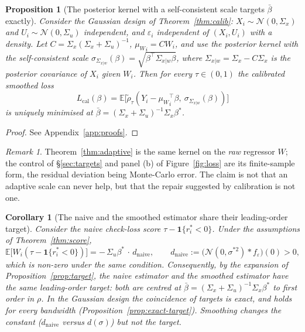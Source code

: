 \documentclass[12pt,a4paper]{article}
\newtheorem{proposition}[theorem]{Proposition}
\newtheorem{corollary}[theorem]{Corollary}
\theoremstyle{definition}
\theoremstyle{remark}
\newtheorem{remark}[theorem]{Remark}
\newcommand{\E}{\mathbb{E}}
\newcommand{\cN}{\mathcal{N}}
\newcommand{\ind}[1]{\mathbf{1}\{#1\}}
\newcommand{\rht}{\tilde{\rho}_\tau}
\newcommand{\betas}{\beta^*}
\newcommand{\bbar}{\bar{\beta}}
\newcommand{\muv}{\mu_W}
\newcommand{\Sxw}{\Sigma_{x|w}}
\newcommand{\Ccal}{C}
\begin{document}
\begin{proposition}[The posterior kernel with a self-consistent scale targets $\bbar$
exactly]
\label{prop:posterior-adaptive}
Consider the Gaussian design of Theorem~\ref{thm:calib}: $X_i\sim\cN(0,\Sigma_x)$ and
$U_i\sim\cN(0,\Sigma_u)$ independent, and $\varepsilon_i$ independent of $(X_i,U_i)$ with a
density. Let $\Ccal=\Sigma_x(\Sigma_x+\Sigma_u)^{-1}$, ${\muv}_i=\Ccal W_i$, and use the
posterior kernel with the self-consistent scale
$\sigma_{\Sxw}(\beta)=\sqrt{\beta^\top\Sxw\beta}$, where
$\Sxw=\Sigma_x-\Ccal\Sigma_x$ is the posterior covariance of $X_i$ given $W_i$. Then for
every $\tau\in(0,1)$ the calibrated smoothed loss
\begin{equation}
L_{\mathrm{cal}}(\beta)=\E\big[\rht(Y_i-{\muv}_i^\top\beta,\ \sigma_{\Sxw}(\beta))\big]
\label{eq:cal-loss}
\end{equation}
is uniquely minimised at $\bbar=(\Sigma_x+\Sigma_u)^{-1}\Sigma_x\betas$.
\end{proposition}

\begin{proof}
See Appendix~\ref{app:proofs}.
\end{proof}

\begin{remark}
Theorem~\ref{thm:adaptive} is the same kernel on the \emph{raw} regressor $W$; the control of
\S\ref{sec:targets} and panel (b) of Figure~\ref{fig:loss} are its finite-sample form, the
residual deviation being Monte-Carlo error. The claim is not that an adaptive scale can never
help, but that the repair suggested by calibration is not one.
\end{remark}

\begin{corollary}[The naive and the smoothed estimator share their leading-order target]
\label{cor:same-target}
Consider the naive check-loss score $\tau-\ind{r_i^*<0}$. Under the assumptions of
Theorem~\ref{thm:score},
\begin{equation}
\E\big[W_i(\tau-\ind{r_i^*<0})\big] = -\,\Sigma_u\betas \,\cdot\, d_{\mathrm{naive}},
\qquad
d_{\mathrm{naive}} := \big(\cN(0,\sigma^{*2})*f_\varepsilon\big)(0) > 0 ,
\label{eq:naive-bias}
\end{equation}
which is non-zero under the same condition. Consequently, by the expansion of
Proposition~\ref{prop:target}, the naive estimator and the smoothed estimator have the
\emph{same} leading-order target: both are centred at
$\bbar = (\Sigma_x+\Sigma_u)^{-1}\Sigma_x\betas$ to first order in $\rho$. In the Gaussian
design the coincidence of targets is exact, and holds for every bandwidth
(Proposition~\ref{prop:exact-target}). Smoothing
changes the constant ($d_{\mathrm{naive}}$ versus $d(\sigma)$) but not the target.
\end{corollary}
\end{document}
